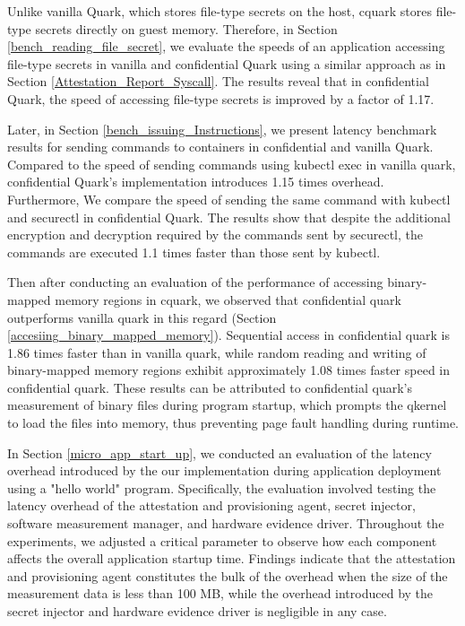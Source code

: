 Unlike vanilla Quark, which stores file-type secrets on the host, cquark stores file-type secrets directly on guest memory. Therefore, in Section \ref{bench_reading_file_secret}, we evaluate the speeds of an application accessing file-type secrets in vanilla and confidential Quark using a similar 
approach as in Section \ref{Attestation_Report_Syscall}. The results reveal that in confidential Quark, the speed of accessing file-type secrets is improved by a factor of 1.17.

Later, in Section \ref{bench_issuing_Instructions}, we present latency  benchmark results for sending commands to containers in confidential and vanilla Quark. Compared to the speed of sending commands using kubectl exec\cite*{kubectl} in vanilla quark, confidential Quark's implementation 
introduces 1.15 times overhead. Furthermore, We compare the speed of sending the same command with kubectl and securectl in confidential Quark. The results show that despite the additional encryption and decryption required by the commands sent by securectl, the commands are 
executed 1.1 times faster than those sent by kubectl.

Then after conducting an evaluation of the performance of accessing binary-mapped memory regions in cquark, we observed that confidential quark outperforms vanilla quark in this regard (Section \ref{accesiing_binary_mapped_memory}). Sequential access in confidential quark is 1.86 times faster than in 
vanilla quark, while random reading and writing of binary-mapped memory regions exhibit approximately 1.08 times faster speed in confidential quark. These results can be attributed to confidential quark's measurement of binary files during program startup, which prompts the qkernel to load 
the files into memory, thus preventing  page fault handling during runtime.

In Section \ref{micro_app_start_up}, we conducted an evaluation of the latency overhead introduced by the our implementation during application deployment using a "hello world" program.  Specifically, the evaluation involved testing the latency overhead of the attestation and provisioning agent, 
secret injector, software measurement manager, and hardware evidence driver. Throughout the experiments, we adjusted a critical parameter to observe how each component affects the overall application startup time. Findings indicate that the attestation and provisioning agent constitutes 
the bulk of the overhead when the size of the measurement data is less than 100 MB, while the overhead introduced by the secret injector and hardware evidence driver is negligible in any case. 


